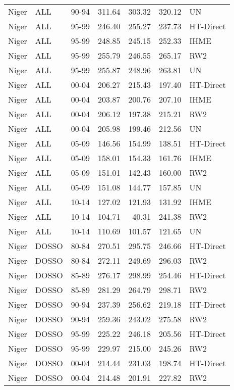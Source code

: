 \begin{longtable}{lllrrrl}
  Niger & ALL & 90-94 & 311.64 & 303.32 & 320.12 & UN \\ 
  Niger & ALL & 95-99 & 246.40 & 255.27 & 237.73 & HT-Direct \\ 
  Niger & ALL & 95-99 & 248.85 & 245.15 & 252.33 & IHME \\ 
  Niger & ALL & 95-99 & 255.79 & 246.55 & 265.17 & RW2 \\ 
  Niger & ALL & 95-99 & 255.87 & 248.96 & 263.81 & UN \\ 
  Niger & ALL & 00-04 & 206.27 & 215.43 & 197.40 & HT-Direct \\ 
  Niger & ALL & 00-04 & 203.87 & 200.76 & 207.10 & IHME \\ 
  Niger & ALL & 00-04 & 206.12 & 197.38 & 215.21 & RW2 \\ 
  Niger & ALL & 00-04 & 205.98 & 199.46 & 212.56 & UN \\ 
  Niger & ALL & 05-09 & 146.56 & 154.99 & 138.51 & HT-Direct \\ 
  Niger & ALL & 05-09 & 158.01 & 154.33 & 161.76 & IHME \\ 
  Niger & ALL & 05-09 & 151.01 & 142.43 & 160.00 & RW2 \\ 
  Niger & ALL & 05-09 & 151.08 & 144.77 & 157.85 & UN \\ 
  Niger & ALL & 10-14 & 127.02 & 121.93 & 131.92 & IHME \\ 
  Niger & ALL & 10-14 & 104.71 & 40.31 & 241.38 & RW2 \\ 
  Niger & ALL & 10-14 & 110.69 & 101.57 & 121.65 & UN \\ 
  Niger & DOSSO & 80-84 & 270.51 & 295.75 & 246.66 & HT-Direct \\ 
  Niger & DOSSO & 80-84 & 272.11 & 249.69 & 296.03 & RW2 \\ 
  Niger & DOSSO & 85-89 & 276.17 & 298.99 & 254.46 & HT-Direct \\ 
  Niger & DOSSO & 85-89 & 281.29 & 264.79 & 298.71 & RW2 \\ 
  Niger & DOSSO & 90-94 & 237.39 & 256.62 & 219.18 & HT-Direct \\ 
  Niger & DOSSO & 90-94 & 259.36 & 243.02 & 275.58 & RW2 \\ 
  Niger & DOSSO & 95-99 & 225.22 & 246.18 & 205.56 & HT-Direct \\ 
  Niger & DOSSO & 95-99 & 229.97 & 215.00 & 245.26 & RW2 \\ 
  Niger & DOSSO & 00-04 & 214.44 & 231.03 & 198.74 & HT-Direct \\ 
  Niger & DOSSO & 00-04 & 214.48 & 201.91 & 227.82 & RW2 \\ 

\end{longtable}
